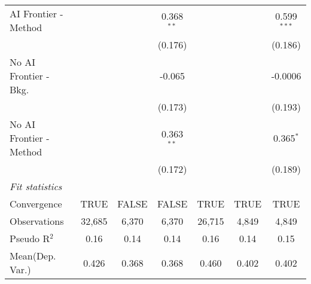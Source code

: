 \begin{tabular}{lcccccc}
   AI Frontier - Method    &               &               & 0.368$^{**}$  &               &               & 0.599$^{***}$\\   
                           &               &               & (0.176)       &               &               & (0.186)\\   
   No AI Frontier - Bkg.   &               &               & -0.065        &               &               & -0.0006\\   
                           &               &               & (0.173)       &               &               & (0.193)\\   
   No AI Frontier - Method &               &               & 0.363$^{**}$  &               &               & 0.365$^{*}$\\   
                           &               &               & (0.172)       &               &               & (0.189)\\   
   \midrule
   \emph{Fit statistics}\\
   Convergence             &TRUE           & FALSE         & FALSE         & TRUE          & TRUE          & TRUE\\  
   Observations            & 32,685        & 6,370         & 6,370         & 26,715        & 4,849         & 4,849\\  
   Pseudo R$^2$            & 0.16          & 0.14          & 0.14          & 0.16          & 0.14          & 0.15\\  
Mean(Dep. Var.) & 0.426 & 0.368 & 0.368 & 0.460 & 0.402 & 0.402 \\
   

\end{tabular}
